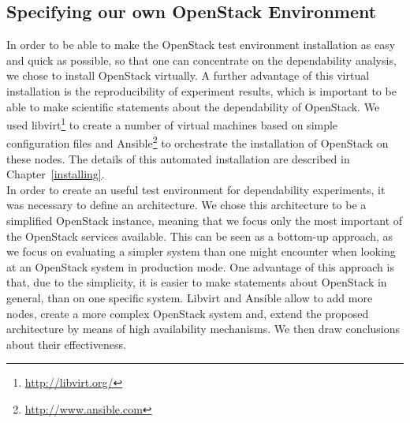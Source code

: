 \subsection{Specifying our own OpenStack Environment}
In order to be able to make the OpenStack test environment installation as easy and quick as possible, so that one can concentrate on the dependability analysis, we chose to install OpenStack virtually. A further advantage of this virtual installation is the reproducibility of experiment results, which is important to be able to make scientific statements about the dependability of OpenStack. We used libvirt\footnote{\url{http://libvirt.org/}} to create a number of virtual machines based on simple configuration files and Ansible\footnote{\url{http://www.ansible.com}} to orchestrate the installation of OpenStack on these nodes. The details of this automated installation are described in Chapter~\ref{installing}.\\

In order to create an useful test environment for dependability experiments, it was necessary to define an architecture. We chose this architecture to be a simplified OpenStack instance, meaning that we focus only the most important of the OpenStack services available. This can be seen as a bottom-up approach, as we focus on evaluating a simpler system than one might encounter when looking at an OpenStack system in production mode. One advantage of this approach is that, due to the simplicity, it is easier to make statements about OpenStack in general, than on one specific system. Libvirt and Ansible allow to add more nodes, create a more complex OpenStack system and, extend the proposed architecture by means of high availability mechanisms. We then draw conclusions about their effectiveness.\\

